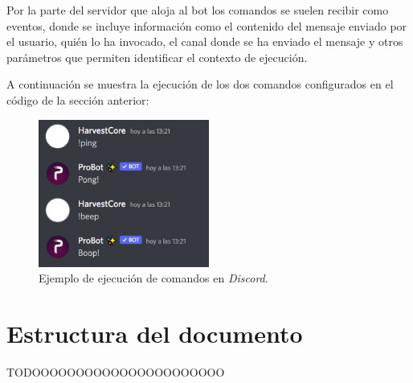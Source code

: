 Por la parte del servidor que aloja al bot los comandos se suelen recibir como eventos, donde se incluye información como el contenido del mensaje enviado por el usuario, quién lo ha invocado, el canal donde se ha enviado el mensaje y otros parámetros que permiten identificar el contexto de ejecución.

A continuación se muestra la ejecución de los dos comandos configurados en el código de la sección anterior:

\begin{figure}[H]
	\centering
	\includegraphics[width=0.5\textwidth]{img/commands.png}
	\caption{Ejemplo de ejecución de comandos en \textit{Discord}.}
\end{figure}



\section{Estructura del documento}

TODOOOOOOOOOOOOOOOOOOOOOO
